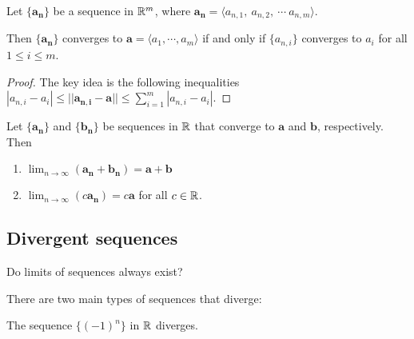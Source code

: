 \begin{theorem}\label{limseqcomponentwise}
    Let $\{\bm{a_n}\}$ be a sequence in $\mathbb{R}^m$, where $\bm{a_n} = \langle a_{n,1},\  a_{n,2},\  \cdots \ a_{n,m} \rangle$.
    
    \vspace{1em}
    
    Then $\{\bm{a_n}\}$ converges to $\bm{a} = \langle a_1, \cdots, a_m \rangle$ if and only if $\{a_{n,i}\}$ converges to $a_i$ for all $1 \leq i \leq m$.
    
    
    \end{theorem}

\begin{proof}
The key idea is the following inequalities $|a_{n,i} - a_i| \leq ||\bm{a_{n,i}} - \bm{a}|| \leq \sum_{i=1}^m |a_{n,i} - a_i|$.
\end{proof}



    \begin{corollary}
    Let $\{\bm{a_n}\}$ and $\{\bm{b_n}\}$ be sequences in $\mathbb{R}$ that converge to $\bm{a}$ and $\bm{b}$, respectively. Then
    
    \begin{enumerate}
        \item $\lim_{n \to \infty}(\bm{a_n} + \bm{b_n}) = \bm{a + b}$
        \item $\lim_{n \to \infty}\left(c\bm{a_n}\right) = c\bm{a}$ for all $c \in \mathbb{R}$.
    \end{enumerate}
    
    
    \end{corollary}







\subsection{Divergent sequences}




\begin{motivating}
Do limits of sequences always exist?
\end{motivating}

There are two main types of sequences that diverge:

    \begin{example}
    The sequence $\{(-1)^n\}$ in $\mathbb{R}$ diverges.
    \end{example}
    
